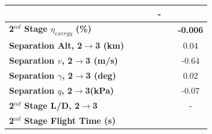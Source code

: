 \begin{table}[ht]
\begin{tabular}{l c c c c c c}
		& \firstsecondSeparationgammaCdThreeStandardNoReturn
		& \firstsecondSeparationgammaCdThreeOneHundredTenNoReturn
		& \firstsecondSeparationgammaCdThreeOneHundredTwentyNoReturn
		& -
		\\
		\hline 
		\textbf{2$^{nd}$ Stage $\eta_{exergy}$ (\%)}
		& \textbf{\secondExergyEffCdThreeEightyNoReturn}
		& \textbf{\secondExergyEffCdThreeNinetyNoReturn}
		& \textbf{\secondExergyEffCdThreeStandardNoReturn}
		& \textbf{\secondExergyEffCdThreeOneHundredTenNoReturn}
		& \textbf{\secondExergyEffCdThreeOneHundredTwentyNoReturn}
		& \textbf{-0.006}
		\\
		\textbf{Separation Alt, 2$\rightarrow$3 (km)}
		& \secondthirdSeparationAltCdThreeEightyNoReturn
		& \secondthirdSeparationAltCdThreeNinetyNoReturn
		& \secondthirdSeparationAltCdThreeStandardNoReturn
		& \secondthirdSeparationAltCdThreeOneHundredTenNoReturn
		& \secondthirdSeparationAltCdThreeOneHundredTwentyNoReturn
		&0.04
		\\
		\textbf{Separation $v$, 2$\rightarrow$3 (m/s)}
		& \secondthirdSeparationvCdThreeEightyNoReturn
		& \secondthirdSeparationvCdThreeNinetyNoReturn
		& \secondthirdSeparationvCdThreeStandardNoReturn
		& \secondthirdSeparationvCdThreeOneHundredTenNoReturn
		& \secondthirdSeparationvCdThreeOneHundredTwentyNoReturn
		&-0.64
		\\
		\textbf{Separation $\gamma$, 2$\rightarrow$3 (deg)}
		& \secondthirdSeparationgammaCdThreeEightyNoReturn
		& \secondthirdSeparationgammaCdThreeNinetyNoReturn
		& \secondthirdSeparationgammaCdThreeStandardNoReturn
		& \secondthirdSeparationgammaCdThreeOneHundredTenNoReturn
		& \secondthirdSeparationgammaCdThreeOneHundredTwentyNoReturn
		&0.02
		\\
		\textbf{Separation $q$, 2$\rightarrow$3(kPa)}
		& \secondthirdSeparationqCdThreeEightyNoReturn
		& \secondthirdSeparationqCdThreeNinetyNoReturn
		& \secondthirdSeparationqCdThreeStandardNoReturn
		& \secondthirdSeparationqCdThreeOneHundredTenNoReturn
		& \secondthirdSeparationqCdThreeOneHundredTwentyNoReturn
		&-0.07
		\\
		\textbf{2$^{nd}$ Stage L/D, 2$\rightarrow$3}
		& \secondthirdSeparationLDCdThreeEightyNoReturn
		& \secondthirdSeparationLDCdThreeNinetyNoReturn
		& \secondthirdSeparationLDCdThreeStandardNoReturn
		& \secondthirdSeparationLDCdThreeOneHundredTenNoReturn
		& \secondthirdSeparationLDCdThreeOneHundredTwentyNoReturn
		& -
		\\
		\textbf{2$^{nd}$ Stage Flight Time (s)}
		& \secondFlightTimeCdThreeEightyNoReturn
		& \secondFlightTimeCdThreeNinetyNoReturn

\end{tabular}
\end{table}
